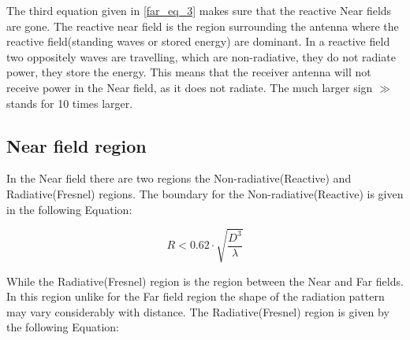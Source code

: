 
The third equation given in \ref{far_eq_3} makes sure that the reactive Near fields are gone. The reactive near field is the region surrounding the antenna where the reactive field(standing waves or stored energy) are dominant. In a reactive field two oppositely waves are travelling, which are non-radiative, they do not radiate power, they store the energy. This means that the receiver antenna will not receive power in the Near field, as it does not radiate. %
The much larger sign $\gg$ stands for 10 times larger. 













\subsection{Near field region}

In the Near field there are two regions the Non-radiative(Reactive) and Radiative(Fresnel) regions. The boundary for the Non-radiative(Reactive) is given in the following Equation:

\begin{equation}
R < 0.62 \cdot \sqrt{\frac{D^{3}}{\lambda}}
\label{near_field_eq}
\end{equation}


While the Radiative(Fresnel) region is the region between the Near and Far fields. In this region unlike for the Far field region the shape of the radiation pattern may vary considerably with distance. The Radiative(Fresnel) region is given by the following Equation:


